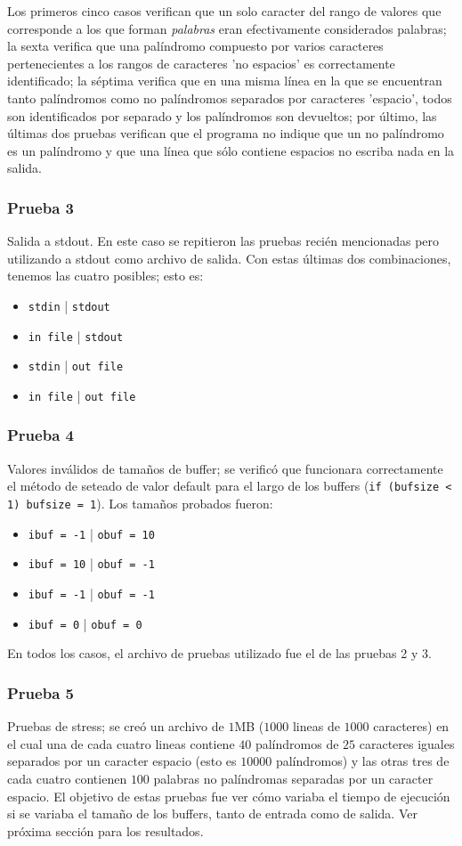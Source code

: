 \documentclass[a4paper, 10pt]{article}
\def\code#1{\texttt{#1}}
\newcommand\tab[1][0.5cm]{\hspace*{#1}}
\begin{document}
				\tab Los primeros cinco casos verifican que un solo caracter del rango de valores que corresponde a los que forman
				\emph{palabras} eran efectivamente considerados palabras; la sexta verifica que una palíndromo compuesto por varios
				caracteres pertenecientes a los rangos de caracteres 'no espacios' es correctamente identificado; la séptima
				verifica que en una misma línea en la que se encuentran tanto palíndromos como no palíndromos separados por
				caracteres 'espacio', todos son identificados por separado y los palíndromos son devueltos; por último, las últimas
				dos pruebas verifican que el programa no indique que un no palíndromo es un palíndromo y que una línea que sólo
				contiene espacios no escriba nada en la salida.
			\subsubsection{Prueba 3}			
				Salida a stdout. En este caso se repitieron las pruebas recién mencionadas pero utilizando a stdout como archivo de 
				salida. Con estas últimas dos combinaciones, tenemos las cuatro posibles; esto es:
				\begin{itemize}
					\item \code{stdin}   | \code{stdout}
					\item \code{in file} | \code{stdout}
					\item \code{stdin}   | \code{out file}
					\item \code{in file} | \code{out file}
				\end{itemize}
			\subsubsection{Prueba 4}			
				Valores inválidos de tamaños de buffer; se verificó que funcionara correctamente el método de seteado de valor
				default para el largo de los buffers (\code{if (bufsize < 1) bufsize = 1}). Los tamaños probados fueron:
				\begin{itemize}
					\item \code{ibuf = -1} | \code{obuf = 10}
					\item \code{ibuf = 10} | \code{obuf = -1}
					\item \code{ibuf = -1} | \code{obuf = -1}
					\item \code{ibuf = 0}  | \code{obuf = 0}
				\end{itemize}
				\tab En todos los casos, el archivo de pruebas utilizado fue el de las pruebas 2 y 3.
			\subsubsection{Prueba 5}
				Pruebas de stress; se creó un archivo de $1$MB ($1000$ lineas de $1000$ caracteres) en el cual una de cada 
				cuatro lineas contiene $40$ palíndromos de $25$ caracteres iguales separados por un caracter espacio (esto es 
				$10000$ palíndromos) y las otras tres de cada cuatro contienen $100$ palabras no palíndromas separadas por un caracter
				espacio. El objetivo de estas pruebas fue ver cómo variaba el tiempo de ejecución si se variaba el tamaño de los
				buffers, tanto de entrada como de salida. Ver próxima sección para los resultados.
				
\end{document}
